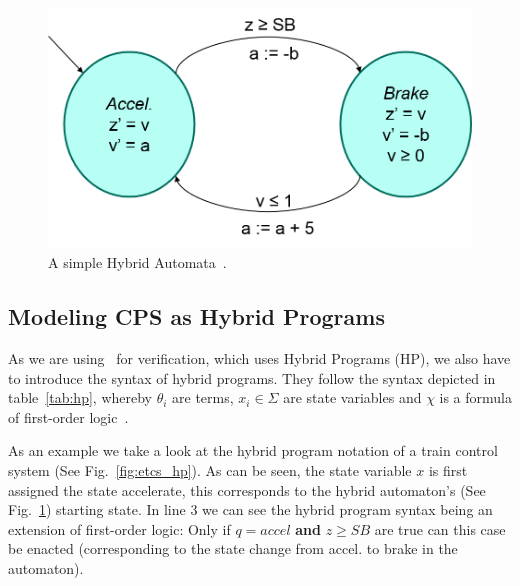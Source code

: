 \begin{figure}[ht!]
	\centering
	\includegraphics[width=1.0\textwidth]{images/automata}
	\caption{A simple Hybrid Automata~\cite{platzer2010b}.}
	\label{fig:automata}
\end{figure}

\subsection{Modeling CPS as Hybrid Programs}

As we are using \keym~for verification, which uses Hybrid Programs (HP), we also have to introduce the syntax of hybrid programs. They follow the syntax depicted in table~\ref{tab:hp}, whereby \(\theta_i\) are terms, \(x_i \in \Sigma\) are state variables and \(\chi\) is a formula of first-order logic~\cite{platzer2010b}.

As an example we take a look at the hybrid program notation of a train control system (See Fig.~\ref{fig:etcs_hp}). As can be seen, the state variable \(x\) is first assigned the state accelerate, this corresponds to the hybrid automaton's (See Fig.~\ref{fig:automata}) starting state. In line 3 we can see the hybrid program syntax being an extension of first-order logic: Only if \(q=accel\) \textbf{and} \(z \geq SB\) are true can this case be enacted (corresponding to the state change from accel. to brake in the automaton).

